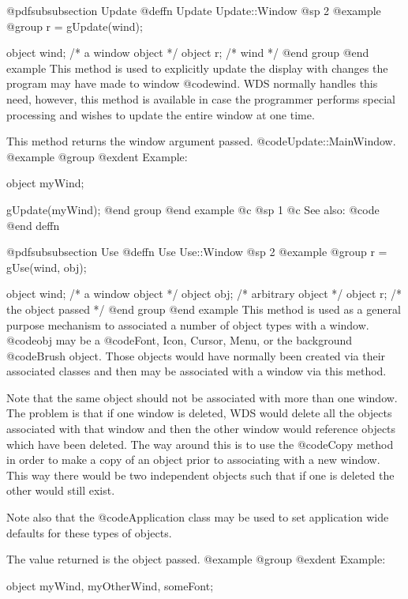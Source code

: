 @pdfsubsubsection {Update}
@deffn {Update} Update::Window
@sp 2
@example
@group
r = gUpdate(wind);

object  wind;   /*  a window object     */
object  r;      /*  wind                */
@end group
@end example
This method is used to explicitly update the display with changes the program
may have made to window @code{wind}.  WDS normally handles this need, however,
this method is available in case the programmer performs special processing
and wishes to update the entire window at one time.

This method returns the window argument passed.
@code{Update::MainWindow}.
@example
@group
@exdent Example:

object  myWind;

gUpdate(myWind);
@end group
@end example
@c @sp 1
@c See also:  @code{}
@end deffn









@pdfsubsubsection {Use}
@deffn {Use} Use::Window
@sp 2
@example
@group
r = gUse(wind, obj);

object  wind;   /*  a window object     */
object  obj;    /*  arbitrary object    */
object  r;      /*  the object passed   */
@end group
@end example
This method is used as a general purpose mechanism to associated a
number of object types with a window.  @code{obj} may be a @code{Font,
Icon, Cursor, Menu,} or the background @code{Brush} object.  Those
objects would have normally been created via their associated classes
and then may be associated with a window via this method.

Note that the same object should not be associated with more than one
window.  The problem is that if one window is deleted, WDS would delete
all the objects associated with that window and then the other window
would reference objects which have been deleted.  The way around this is
to use the @code{Copy} method in order to make a copy of an object prior
to associating with a new window.  This way there would be two
independent objects such that if one is deleted the other would still
exist.

Note also that the @code{Application} class may be used to set application
wide defaults for these types of objects.

The value returned is the object passed.
@example
@group
@exdent Example:

object  myWind, myOtherWind, someFont;


